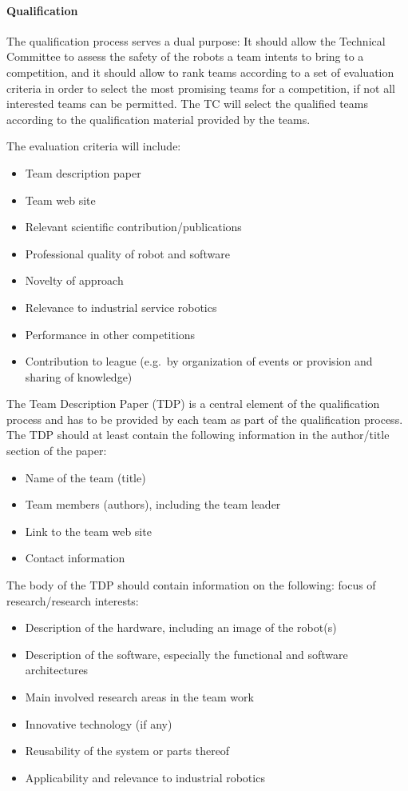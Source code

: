 \paragraph{Qualification}
\label{par:CompQualification}

The qualification process serves a dual purpose: It should allow the Technical Committee to assess the safety of the robots a team intents to bring to a competition, and it should allow to rank teams according to a set of evaluation criteria in order to select the most promising teams for a competition, if not all interested teams can be permitted. The TC will select the qualified teams according to the qualification material provided by the teams. 

The evaluation criteria will include:
%
\begin{itemize}	\topsep-12pt\itemsep-2pt
  \item Team description paper
  \item Team web site
  \item Relevant scientific contribution/publications
  \item Professional quality of robot and software
  \item Novelty of approach
  \item Relevance to industrial service robotics
  \item Performance in other competitions
  \item Contribution to \erlir league (e.g.~by organization of events or provision and sharing of knowledge)
\end{itemize}
%
The Team Description Paper (TDP) is a central element of the qualification process and has to be provided by each team as part of the qualification process. 
The TDP should at least contain the following information in the author/title section of the paper:
%
\begin{itemize}	\topsep-12pt\itemsep-2pt
  \item Name of the team (title)
  \item Team members (authors), including the team leader
  \item Link to the team web site
  \item Contact information
\end{itemize}
%
The body of the TDP should contain information on the following:
focus of research/research interests:
%
\begin{itemize}	\topsep-12pt\itemsep-2pt
  \item Description of the hardware, including an image of the robot(s)
  \item Description of the software, especially the functional and software architectures
  \item Main involved research areas in the team work
  \item Innovative technology (if any)
  \item Reusability of the system or parts thereof
  \item Applicability and relevance to industrial robotics
\end{itemize}
